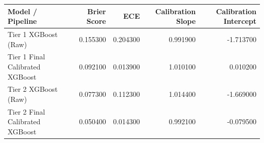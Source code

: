\begin{tabular}{lrrrr}
\toprule
Model / Pipeline & Brier Score & ECE & Calibration Slope & Calibration Intercept \\
\midrule
Tier 1 XGBoost (Raw) & 0.155300 & 0.204300 & 0.991900 & -1.713700 \\
Tier 1 Final Calibrated XGBoost & 0.092100 & 0.013900 & 1.010100 & 0.010200 \\
Tier 2 XGBoost (Raw) & 0.077300 & 0.112300 & 1.014400 & -1.669000 \\
Tier 2 Final Calibrated XGBoost & 0.050400 & 0.014300 & 0.992100 & -0.079500 \\
\bottomrule
\end{tabular}
